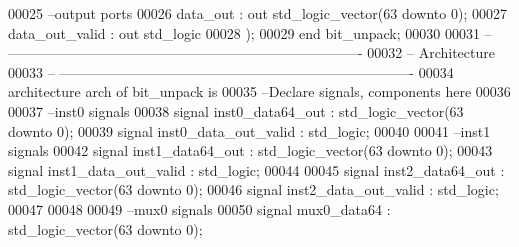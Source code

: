 \begin{DoxyCode}
00025 \textcolor{keyword}{        --output ports }
00026         \textcolor{vhdlchar}{data_out}        \textcolor{vhdlchar}{:} \textcolor{keywordflow}{out} \textcolor{comment}{std\_logic\_vector}\textcolor{vhdlchar}{(}\textcolor{vhdllogic}{}\textcolor{vhdllogic}{63} \textcolor{keywordflow}{downto} \textcolor{vhdllogic}{}\textcolor{vhdllogic}{0}\textcolor{vhdlchar}{)};
00027         \textcolor{vhdlchar}{data_out_valid}  \textcolor{vhdlchar}{:} \textcolor{keywordflow}{out} \textcolor{comment}{std\_logic}       
00028         \textcolor{vhdlchar}{)};
00029 \textcolor{keywordflow}{end} \textcolor{vhdlchar}{bit\_unpack};
00030 
00031 \textcolor{keyword}{-- ----------------------------------------------------------------------------}
00032 \textcolor{keyword}{-- Architecture}
00033 \textcolor{keyword}{-- ----------------------------------------------------------------------------}
00034 \textcolor{keywordflow}{architecture} arch \textcolor{keywordflow}{of} bit_unpack is
00035 \textcolor{keyword}{--Declare signals,  components here}
00036 
00037 \textcolor{keyword}{--inst0 signals}
00038 \textcolor{keywordflow}{signal} \textcolor{vhdlchar}{inst0_data64_out}         \textcolor{vhdlchar}{:} \textcolor{comment}{std\_logic\_vector}\textcolor{vhdlchar}{(}\textcolor{vhdllogic}{}\textcolor{vhdllogic}{63} \textcolor{keywordflow}{downto} \textcolor{vhdllogic}{}\textcolor{vhdllogic}{0}\textcolor{vhdlchar}{)};
00039 \textcolor{keywordflow}{signal} \textcolor{vhdlchar}{inst0_data_out_valid} \textcolor{vhdlchar}{:} \textcolor{comment}{std\_logic};
00040 
00041 \textcolor{keyword}{--inst1 signals}
00042 \textcolor{keywordflow}{signal} \textcolor{vhdlchar}{inst1_data64_out}         \textcolor{vhdlchar}{:} \textcolor{comment}{std\_logic\_vector}\textcolor{vhdlchar}{(}\textcolor{vhdllogic}{}\textcolor{vhdllogic}{63} \textcolor{keywordflow}{downto} \textcolor{vhdllogic}{}\textcolor{vhdllogic}{0}\textcolor{vhdlchar}{)};
00043 \textcolor{keywordflow}{signal} \textcolor{vhdlchar}{inst1_data_out_valid} \textcolor{vhdlchar}{:} \textcolor{comment}{std\_logic};
00044 
00045 \textcolor{keywordflow}{signal} \textcolor{vhdlchar}{inst2_data64_out}       \textcolor{vhdlchar}{:} \textcolor{comment}{std\_logic\_vector}\textcolor{vhdlchar}{(}\textcolor{vhdllogic}{}\textcolor{vhdllogic}{63} \textcolor{keywordflow}{downto} \textcolor{vhdllogic}{}\textcolor{vhdllogic}{0}\textcolor{vhdlchar}{)};
00046 \textcolor{keywordflow}{signal} \textcolor{vhdlchar}{inst2_data_out_valid}   \textcolor{vhdlchar}{:} \textcolor{comment}{std\_logic};
00047 
00048 
00049 \textcolor{keyword}{--mux0 signals}
00050 \textcolor{keywordflow}{signal} \textcolor{vhdlchar}{mux0_data64}              \textcolor{vhdlchar}{:} \textcolor{comment}{std\_logic\_vector}\textcolor{vhdlchar}{(}\textcolor{vhdllogic}{}\textcolor{vhdllogic}{63} \textcolor{keywordflow}{downto} \textcolor{vhdllogic}{}\textcolor{vhdllogic}{0}\textcolor{vhdlchar}{)};

\end{DoxyCode}
